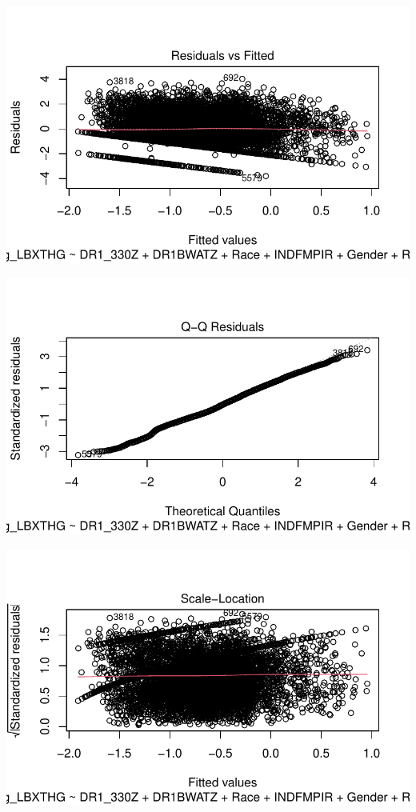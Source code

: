\documentclass[
  letterpaper,
  DIV=11,
  numbers=noendperiod]{scrartcl}
\begin{document}
\includegraphics{_IDS702_Final_Report_Feedback_files/figure-pdf/unnamed-chunk-21-1.pdf}

\includegraphics{_IDS702_Final_Report_Feedback_files/figure-pdf/unnamed-chunk-21-2.pdf}

\includegraphics{_IDS702_Final_Report_Feedback_files/figure-pdf/unnamed-chunk-21-3.pdf}
\end{document}
